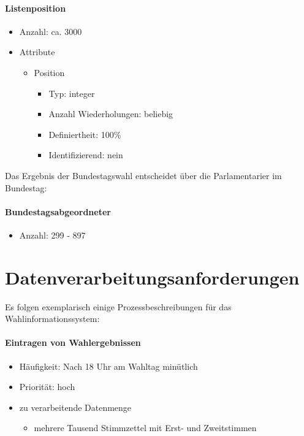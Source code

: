 \documentclass[a4paper]{article}
\begin{document}
\paragraph{Listenposition}
\begin{itemize}
\item Anzahl: ca. 3000
\item Attribute
	\begin{itemize}
	\item Position
		\begin{itemize}
		\item Typ: integer
		\item Anzahl Wiederholungen: beliebig
		\item Definiertheit: 100\%
		\item Identifizierend: nein
		\end{itemize}
	\end{itemize}
\end{itemize}

Das Ergebnis der Bundestagswahl entscheidet über die Parlamentarier im Bundestag:

\paragraph{Bundestagsabgeordneter}
\begin{itemize}
\item Anzahl: 299 - 897
\end{itemize}

\section{Datenverarbeitungsanforderungen}

Es folgen exemplarisch einige Prozessbeschreibungen für das Wahlinformationssystem:

\paragraph{Eintragen von Wahlergebnissen}
\begin{itemize}
\item Häufigkeit: Nach 18 Uhr am Wahltag minütlich
\item Priorität: hoch
\item zu verarbeitende Datenmenge
\begin{itemize}
	\item mehrere Tausend Stimmzettel mit Erst- und Zweitstimmen
\end{itemize}
\end{itemize}
\end{document}
